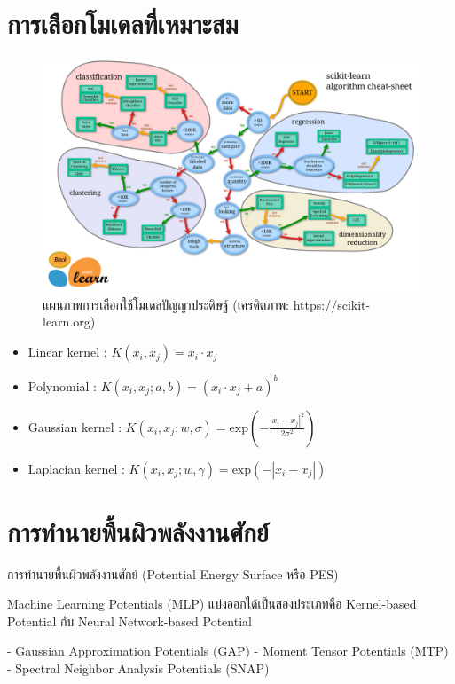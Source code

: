 \section{การเลือกโมเดลที่เหมาะสม}

\begin{figure}[H]
    \centering
    \includegraphics[width=0.9\linewidth]{fig/ml_map.png}
    \caption{แผนภาพการเลือกใช้โมเดลปัญญาประดิษฐ์ (เครดิตภาพ: https://scikit-learn.org)}
    \label{fig:ml_map}
\end{figure}

\begin{itemize}
    \item Linear kernel : $K(x_i, x_j) = x_i \cdot x_j$
    \item Polynomial : $K(x_i, x_j; a, b) = (x_i \cdot x_j + a)^b$
    \item Gaussian kernel : $K(x_i, x_j; w, \sigma) = \mathrm{exp}\left(-\frac{|x_i-x_j|^2}{2\sigma^2}\right)$
    \item Laplacian kernel : $K(x_i, x_j; w, \gamma) = \mathrm{exp}\left(-{|x_i-x_j|}\right)$
\end{itemize}

\section{การทำนายพื้นผิวพลังงานศักย์}

การทำนายพื้นผิวพลังงานศักย์ (Potential Energy Surface หรือ PES)

Machine Learning Potentials (MLP) แบ่งออกได้เป็นสองประเภทคือ Kernel-based Potential กับ Neural Network-based Potential

- Gaussian Approximation Potentials (GAP)\cite{bartok2010}
- Moment Tensor Potentials (MTP)\cite{shapeev2016}
- Spectral Neighbor Analysis Potentials (SNAP)\cite{thompson2015}


